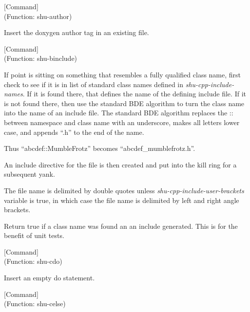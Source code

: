 \vspace{1em}
\noindent
{}
\usebox{\funcname}
 \hfill [Command]\\%
 (Function: shu-author)

\begin{doc-string}
Insert the doxygen author tag in an existing file.
\end{doc-string}

\vspace{1em}
\noindent
{}
\usebox{\funcname}
 \hfill [Command]\\%
 (Function: shu-binclude)

\begin{doc-string}
If point is sitting on something that resembles a fully qualified class name,
first check to see if it is in list of standard class names defined in
\emph{shu-cpp-include-names}.  If it is found there, that defines the name of the
defining include file.  If it is not found there, then use the standard BDE
algorithm to turn the class name into the name of an include file.  The standard
BDE algorithm replaces the :: between namespace and class name with an
underscore, makes all letters lower case, and appends ``.h'' to the end of the
name.

Thus ``abcdef::MumbleFrotz'' becomes ``abcdef\_mumblefrotz.h''.

An include directive for the file is then created and put into the kill ring for
a subsequent yank.

The file name is delimited by double quotes unless \emph{shu-cpp-include-user-brackets}
variable is true, in which case the file name is delimited by left and right
angle brackets.

Return true if a class name was found an an include generated.  This is for the
benefit of unit tests.
\end{doc-string}

\vspace{1em}
\noindent
{}
\usebox{\funcname}
 \hfill [Command]\\%
 (Function: shu-cdo)

\begin{doc-string}
Insert an empty do statement.
\end{doc-string}

\vspace{1em}
\noindent
{}
\usebox{\funcname}
 \hfill [Command]\\%
 (Function: shu-celse)

